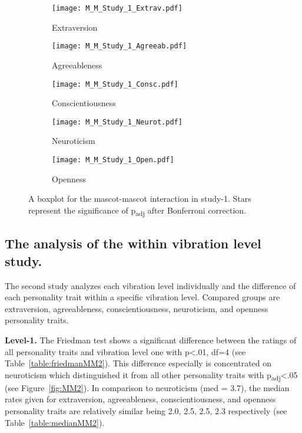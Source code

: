 \begin{figure}[hbt!]
    \centering
    \begin{subfigure}{.40\textwidth}
        \centering
        \texttt{[image: M\_M\_Study\_1\_Extrav.pdf]}
        \caption{Extraversion}
        \label{fig:sub1}
    \end{subfigure}\hfill%
    \begin{subfigure}{.40\textwidth}
        \centering
        \texttt{[image: M\_M\_Study\_1\_Agreeab.pdf]}
        \caption{Agreeableness}
        \label{fig:sub2}
    \end{subfigure}\hfill
    \begin{subfigure}{.40\textwidth}
        \centering
        \texttt{[image: M\_M\_Study\_1\_Consc.pdf]}
        \caption{Conscientiousness}
        \label{fig:sub1}
    \end{subfigure}\hfill%
    \begin{subfigure}{.40\textwidth}
        \centering
        \texttt{[image: M\_M\_Study\_1\_Neurot.pdf]}
        \caption{Neuroticism}
        \label{fig:sub1}
    \end{subfigure}\hfill%
    \begin{subfigure}{.40\textwidth}
        \centering
        \texttt{[image: M\_M\_Study\_1\_Open.pdf]}
        \caption{Openness}
        \label{fig:sub1}
    \end{subfigure}\hfill%
    \caption{A boxplot for the mascot-mascot interaction in study-1.
    Stars represent the significance of p\textsubscript{adj} after Bonferroni correction.}
    \label{fig:MM1}
\end{figure}
\subsection{The analysis of the within vibration level study.}
\label{subsec:MMstudy2}
The second study analyzes each vibration level individually and the difference
of each personality trait within a specific vibration level.
Compared groups are extraversion, agreeableness, conscientiousness, neuroticism, and openness personality traits.

\par\textbf{Level-1.}
The Friedman test shows a significant difference between the ratings of all personality traits
and vibration level one with p<.01, df=4 (see Table~\ref{table:friedmanMM2}).
This difference especially is concentrated on neuroticism which distinguished it from all
other personality traits with p\textsubscript{adj}<.05 (see Figure~\ref{fig:MM2}).
In comparison to neuroticism (med = 3.7), the median rates given for extraversion,
agreeableness, conscientiousness, and openness personality traits are relatively similar
being 2.0, 2.5, 2.5, 2.3 respectively (see Table~\ref{table:medianMM2}).

